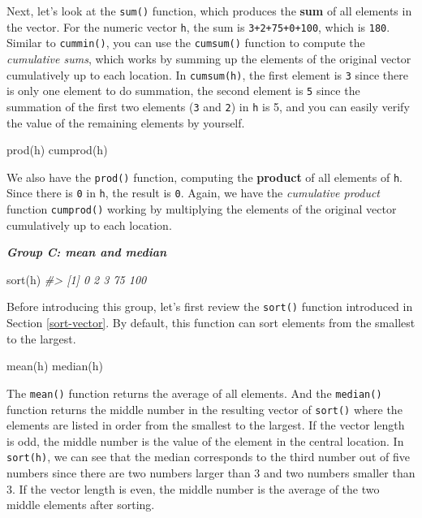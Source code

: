 \documentclass[
]{book}
\newenvironment{Shaded}{\begin{snugshade}}{\end{snugshade}}
\newcommand{\CommentTok}[1]{\textcolor[rgb]{0.56,0.35,0.01}{\textit{#1}}}
\newcommand{\FunctionTok}[1]{\textcolor[rgb]{0.00,0.00,0.00}{#1}}
\newcommand{\NormalTok}[1]{#1}
\begin{document}
Next, let's look at the \texttt{sum()} function, which produces the \textbf{sum} of all elements in the vector. For the numeric vector \texttt{h}, the sum is \texttt{3+2+75+0+100}, which is \texttt{180}. Similar to \texttt{cummin()}, you can use the \texttt{cumsum()} function to compute the \emph{cumulative sums}, which works by summing up the elements of the original vector cumulatively up to each location. In \texttt{cumsum(h)}, the first element is \texttt{3} since there is only one element to do summation, the second element is \texttt{5} since the summation of the first two elements (\texttt{3} and \texttt{2}) in \texttt{h} is 5, and you can easily verify the value of the remaining elements by yourself.

\begin{Shaded}
\begin{Highlighting}[]
\FunctionTok{prod}\NormalTok{(h)}
\FunctionTok{cumprod}\NormalTok{(h)}
\end{Highlighting}
\end{Shaded}

We also have the \texttt{prod()} function, computing the \textbf{product} of all elements of \texttt{h}. Since there is \texttt{0} in \texttt{h}, the result is \texttt{0}. Again, we have the \emph{cumulative product} function \texttt{cumprod()} working by multiplying the elements of the original vector cumulatively up to each location.

\textbf{\emph{Group C: mean and median}}

\begin{Shaded}
\begin{Highlighting}[]
\FunctionTok{sort}\NormalTok{(h)}
\CommentTok{\#\textgreater{} [1]   0   2   3  75 100}
\end{Highlighting}
\end{Shaded}

Before introducing this group, let's first review the \texttt{sort()} function introduced in Section \ref{sort-vector}. By default, this function can sort elements from the smallest to the largest.

\begin{Shaded}
\begin{Highlighting}[]
\FunctionTok{mean}\NormalTok{(h)}
\FunctionTok{median}\NormalTok{(h)}
\end{Highlighting}
\end{Shaded}

The \texttt{mean()} function returns the average of all elements. And the \texttt{median()} function returns the middle number in the resulting vector of \texttt{sort()} where the elements are listed in order from the smallest to the largest. If the vector length is odd, the middle number is the value of the element in the central location. In \texttt{sort(h)}, we can see that the median corresponds to the third number out of five numbers since there are two numbers larger than 3 and two numbers smaller than 3. If the vector length is even, the middle number is the average of the two middle elements after sorting.
\end{document}
